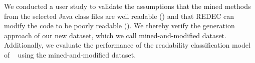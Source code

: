 \documentclass[%
class=scrreprt,
chapterprefix=false,%
open=right,%
twoside=false,%
paper=a4,%
logofile={Logo\_zentral\_farbig\_EN.png},%
thesistype=master,%
UKenglish,%
]{se2thesis}
\newcounter{urlfootnote}
\newcommand{\onecurl}[2]{%
	\stepcounter{urlfootnote}%
	\expandafter\def\csname urlfootnote:#1\endcsname{\theurlfootnote}%
	\footnote{\label{url:#1}\url{#1}, accessed: #2}%
}
\newcommand{\curl}[2]{%
	\ifcsdef{urlfootnote:#1}{%
		\textsuperscript{\ref{url:#1}}%
	}{%
		\onecurl{#1}{#2}%
	}%
}
\theoremstyle{definition}
\newcommand{\citeolddataset}{\cite{buse2009learning, dorn2012general, scalabrino2018comprehensive}\xspace}
\newcommand{\rdh}{REDEC\xspace}
\begin{document}
%	

	We conducted a user study to validate the assumptions that the mined methods from the selected Java class files are well readable () and that \rdh can modify the code to be poorly readable (). We thereby verify the generation approach of our new dataset, which we call mined-and-modified dataset.
	Additionally, we evaluate the performance of the readability classification model of \citeauthor{mi2022towards}~\cite{mi2022towards} using the mined-and-modified dataset.
		
\end{document}
